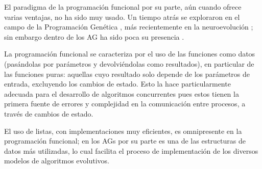 El paradigma de la programación funcional por su parte, aún cuando ofrece varias ventajas, no ha sido muy usado. Un tiempo atrás se exploraron en el campo de la Programación Genética \cite{Briggs:2008:FGP:1375341.1375345,Huelsbergen:1996:TSE:1595536.1595579,walsh:1999:AFSFESIHLP}, más recientemente en la neuroevolución  \cite{Sher2013}; sin embargo dentro de los AG ha sido poca su presencia \cite{Hawkins:2001:GFG:872017.872197}.

La programación funcional se caracteriza por el uso de las funciones como datos (pasándolas por parámetros y devolviéndolas como resultados), en particular de las funciones puras: aquellas cuyo resultado solo depende de los parámetros de entrada, excluyendo los cambios de estado. Esto la hace particularmente adecuada para el desarrollo de algoritmos concurrentes pues estos tienen la primera fuente de errores y complejidad en la comunicación entre procesos, a través de cambios de estado.

El uso de listas, con implementaciones muy eficientes, es omnipresente en la programación funcional; en los AGs por su parte es una de las estructuras de datos más utilizadas, lo cual facilita el proceso de implementación de los diversos modelos de algoritmos evolutivos.

